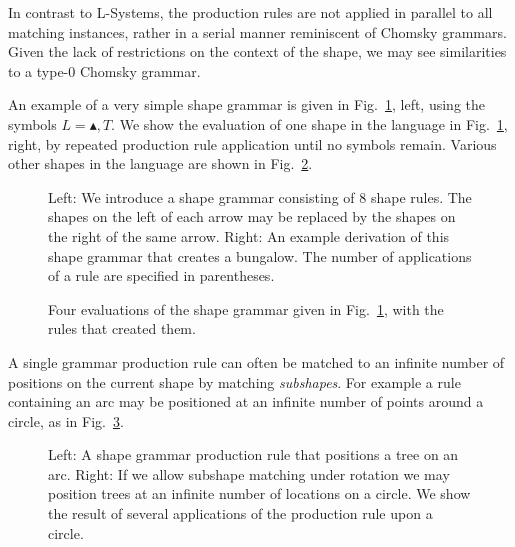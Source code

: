 In contrast to L-Systems, the production rules are not applied in parallel to all matching instances, rather in a serial manner reminiscent of Chomsky grammars\cite{Chom56}. Given the lack of restrictions on the context of the shape, we may see similarities to a type-0 Chomsky grammar. 

An example of a very simple \facade{} shape grammar is given in Fig.~\ref{fig:myShapeGrammar}, left, using the symbols $L = \blacktriangle,T$. We show the evaluation of one shape in the language in Fig.~\ref{fig:myShapeGrammar}, right, by repeated production rule application until no symbols remain. Various other shapes in the language are shown in Fig.~\ref{fig:myGrammarResults}.

\begin{figure}
\centering
\def\svgwidth{1.\columnwidth}

\caption[A simple \facade{} shape grammar]{\label{fig:myShapeGrammar} Left: We introduce a shape grammar consisting of 8 shape rules. The shapes on the left of each arrow may be replaced by the shapes on the right of the same arrow. Right: An example derivation of this shape grammar that creates a bungalow. The number of applications of a rule are specified in parentheses.}
\end{figure}

\begin{figure}
\centering
\def\svgwidth{0.8\columnwidth}

\caption[Evaluations of a shape grammar]{Four evaluations of the shape grammar given in Fig.~\ref{fig:myShapeGrammar}, with the rules that created them. 
}
\label{fig:myGrammarResults}
\end{figure}

A single grammar production rule can often be matched to an infinite number of positions on the current shape by matching \emph{subshapes}. For example a rule containing an arc may be positioned at an infinite number of points around a circle, as in Fig.~\ref{fig:ggTree}.

\begin{figure}
\centering
\def\svgwidth{0.8\columnwidth}

\caption[The use of shape grammars to position trees on an circle]{Left: A shape grammar production rule that positions a tree on an arc. Right: If we allow subshape matching under rotation we may position trees at an infinite number of locations on a circle. We show the result of several applications of the production rule upon a circle.}
\label{fig:ggTree}
\end{figure}

